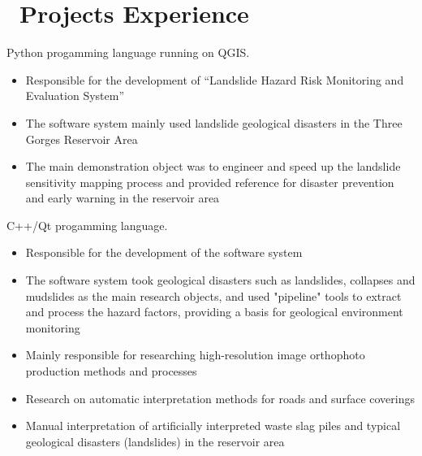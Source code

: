 \documentclass{resume}
\begin{document}
\section{\faGithubAlt\ Projects Experience}


Python progamming language running on QGIS.
\begin{itemize}
  \item Responsible for the development of “Landslide Hazard Risk Monitoring and Evaluation System”
  \item The software system mainly used landslide geological disasters in the Three Gorges Reservoir Area
  \item The main demonstration object was to engineer and speed up the landslide sensitivity mapping process and provided reference for disaster prevention and early warning in the reservoir area
\end{itemize}

C++/Qt progamming language.

\begin{itemize}
  \item Responsible for the development of the software system
  \item The software system took geological disasters such as landslides, collapses and mudslides as the main research objects, and used "pipeline" tools to extract and process the hazard factors, providing a basis for geological environment monitoring
\end{itemize}


\begin{itemize}
  \item Mainly responsible for researching high-resolution image orthophoto production methods and processes
  \item Research on automatic interpretation methods for roads and surface coverings
  \item Manual interpretation of artificially interpreted waste slag piles and typical geological disasters (landslides) in the reservoir area
\end{itemize}
\end{document}
